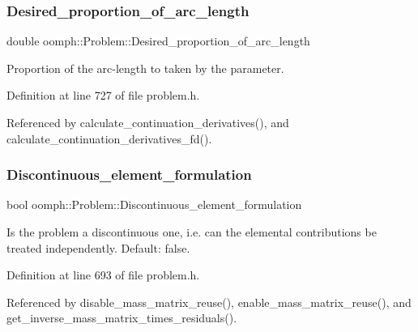 \subsubsection{\texorpdfstring{Desired\+\_\+proportion\+\_\+of\+\_\+arc\+\_\+length}{Desired\_proportion\_of\_arc\_length}}
{\footnotesize\ttfamily double oomph\+::\+Problem\+::\+Desired\+\_\+proportion\+\_\+of\+\_\+arc\+\_\+length\hspace{0.3cm}{\ttfamily [protected]}}



Proportion of the arc-\/length to taken by the parameter. 



Definition at line 727 of file problem.\+h.



Referenced by calculate\+\_\+continuation\+\_\+derivatives(), and calculate\+\_\+continuation\+\_\+derivatives\+\_\+fd().

\mbox{\label{classoomph_1_1Problem_a97ca0078fff6adca318835c11503dc2d}} 
\subsubsection{\texorpdfstring{Discontinuous\+\_\+element\+\_\+formulation}{Discontinuous\_element\_formulation}}
{\footnotesize\ttfamily bool oomph\+::\+Problem\+::\+Discontinuous\+\_\+element\+\_\+formulation\hspace{0.3cm}{\ttfamily [protected]}}



Is the problem a discontinuous one, i.\+e. can the elemental contributions be treated independently. Default\+: false. 



Definition at line 693 of file problem.\+h.



Referenced by disable\+\_\+mass\+\_\+matrix\+\_\+reuse(), enable\+\_\+mass\+\_\+matrix\+\_\+reuse(), and get\+\_\+inverse\+\_\+mass\+\_\+matrix\+\_\+times\+\_\+residuals().

\mbox{\label{classoomph_1_1Problem_a1da221c501adc7d58bd21f630207c6c3}} 
